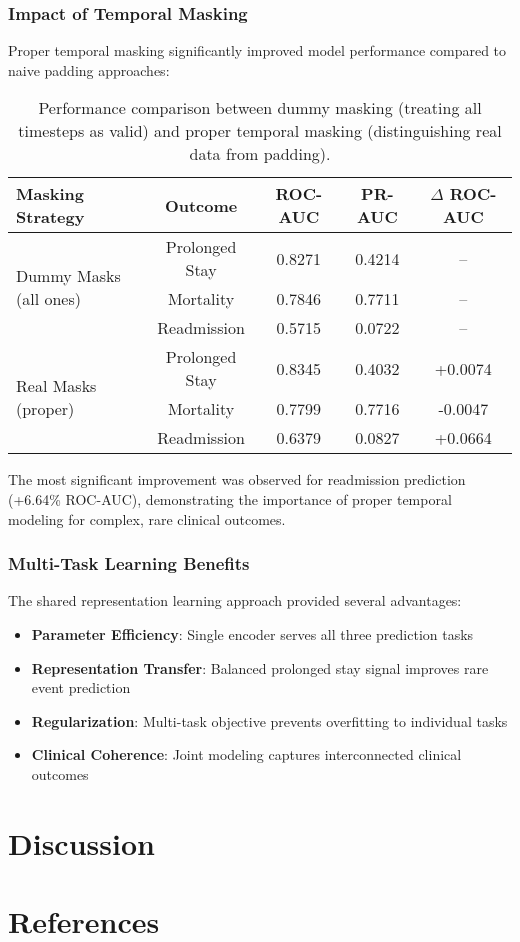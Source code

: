 \documentclass[11pt]{article}
\begin{document}
\subsubsection{Impact of Temporal Masking}

Proper temporal masking significantly improved model performance compared to naive padding approaches:

\begin{table}[h!]
\centering
\begin{tabular}{lcccc}
\toprule
\textbf{Masking Strategy} & \textbf{Outcome} & \textbf{ROC-AUC} & \textbf{PR-AUC} & \textbf{$\Delta$ ROC-AUC} \\
\midrule
\multirow{3}{*}{Dummy Masks (all ones)} & Prolonged Stay & 0.8271 & 0.4214 & -- \\
& Mortality & 0.7846 & 0.7711 & -- \\
& Readmission & 0.5715 & 0.0722 & -- \\
\midrule
\multirow{3}{*}{Real Masks (proper)} & Prolonged Stay & 0.8345 & 0.4032 & +0.0074 \\
& Mortality & 0.7799 & 0.7716 & -0.0047 \\
& Readmission & 0.6379 & 0.0827 & +0.0664 \\
\bottomrule
\end{tabular}
\caption{Performance comparison between dummy masking (treating all timesteps as valid) and proper temporal masking (distinguishing real data from padding).}
\label{tab:masking_comparison}
\end{table}

The most significant improvement was observed for readmission prediction (+6.64\% ROC-AUC), demonstrating the importance of proper temporal modeling for complex, rare clinical outcomes.

\subsubsection{Multi-Task Learning Benefits}

The shared representation learning approach provided several advantages:
\begin{itemize}
    \item \textbf{Parameter Efficiency}: Single encoder serves all three prediction tasks
    \item \textbf{Representation Transfer}: Balanced prolonged stay signal improves rare event prediction
    \item \textbf{Regularization}: Multi-task objective prevents overfitting to individual tasks
    \item \textbf{Clinical Coherence}: Joint modeling captures interconnected clinical outcomes
\end{itemize}

\section{Discussion}

\section{References}
\end{document}
